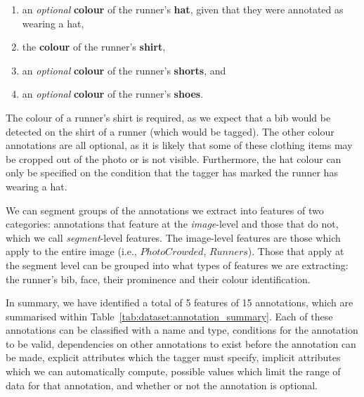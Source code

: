 \begin{enumerate}
  \item an \textit{optional} \textbf{colour} of the runner's \textbf{hat}, given that they were annotated as wearing a hat,
  \item the \textbf{colour} of the runner's \textbf{shirt},
  \item an \textit{optional} \textbf{colour} of the runner's \textbf{shorts}, and
  \item an \textit{optional} \textbf{colour} of the runner's \textbf{shoes}.
\end{enumerate}


The colour of a runner's shirt is required, as we expect that a bib would be detected on the shirt of a runner (which would be tagged). The other colour annotations are all optional, as it is likely that some of these clothing items may be cropped out of the photo or is not visible. Furthermore, the hat colour can only be specified on the condition that the tagger has marked the runner has wearing a hat.

We can segment groups of the annotations we extract into features of two categories: annotations that feature at the \textit{image}-level and those that do not, which we call \textit{segment}-level features. The image-level features are those which apply to the entire image (i.e., $PhotoCrowded$, $Runners$). Those that apply at the segment level can be grouped into what types of features we are extracting: the runner's bib, face, their prominence and their colour identification.

In summary, we have identified a total of 5 features of 15 annotations, which are summarised within Table~\ref{tab:dataset:annotation_summary}. Each of these annotations can be classified with a name and type, conditions for the annotation to be valid, dependencies on other annotations to exist before the annotation can be made, explicit attributes which the tagger must specify, implicit attributes which we can automatically compute, possible values which limit the range of data for that annotation, and whether or not the annotation is optional.

